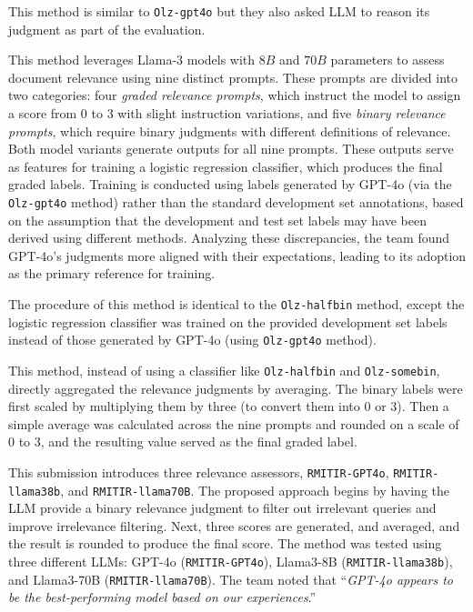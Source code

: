This method is similar to \texttt{Olz-gpt4o} but they also asked LLM to reason its judgment as part of the evaluation.

This method leverages Llama-3 models with $8B$ and $70B$ parameters to assess document relevance using nine distinct prompts. These prompts are divided into two categories: four \emph{graded relevance prompts}, which instruct the model to assign a score from 0 to 3 with slight instruction variations, and five \emph{binary relevance prompts}, which require binary judgments with different definitions of relevance.  
Both model variants generate outputs for all nine prompts. These outputs serve as features for training a logistic regression classifier, which produces the final graded labels. Training is conducted using labels generated by GPT-4o (via the \texttt{Olz-gpt4o} method) rather than the standard development set annotations, based on the assumption that the development and test set labels may have been derived using different methods. Analyzing these discrepancies, the team found GPT-4o’s judgments more aligned with their expectations, leading to its adoption as the primary reference for training.

The procedure of this method is identical to the \texttt{Olz-halfbin} method, except the logistic regression classifier was trained on the provided development set labels instead of those generated by GPT-4o (using \texttt{Olz-gpt4o} method).

This method, instead of using a classifier like \texttt{Olz-halfbin} and \texttt{Olz-somebin}, directly aggregated the relevance judgments by averaging. The binary labels were first scaled by multiplying them by three (to convert them into $0$ or $3$). Then a simple average was calculated across the nine prompts and rounded on a scale of 0 to 3, and the resulting value served as the final graded label.

This submission introduces three relevance assessors, \texttt{RMITIR-GPT4o}, \texttt{RMITIR-llama38b}, and \texttt{RMITIR-llama70B}. The proposed approach begins by having the LLM provide a binary relevance judgment to filter out irrelevant queries and improve irrelevance filtering. Next, three scores are generated, and averaged, and the result is rounded to produce the final score. The method was tested using three different LLMs: GPT-4o (\texttt{RMITIR-GPT4o}), Llama3-8B (\texttt{RMITIR-llama38b}), and Llama3-70B (\texttt{RMITIR-llama70B}). The team noted that ``\textit{GPT-4o appears to be the best-performing model based on our experiences}.''

